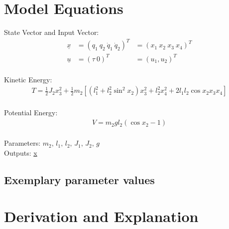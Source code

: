 \documentclass[10pt,a4paper]{article}
\begin{document}
	
	\section{Model Equations} %
	
	State Vector and Input Vector:
	\begin{align*}
		\underline{x} &= (q_1 \ q_2 \ \dot{q}_1 \ \dot{q}_2)^T &= (x_1 \ x_2 \ x_3 \ x_4)^T \\
		\underline{u} &= (\tau \ 0)^T &= (u_1, u_2)^T \\
	\end{align*}
	
	\noindent Kinetic Energy:			
	\begin{subequations}
	\begin{align}
		T = \frac{1}{2}J_2x_3^2 + \frac{1}{2}m_2[(l_1^2 + l_2^2 \sin^2 x_2)x_3^2 + l_2^2x_4^2 + 2l_1l_2 \cos x_2x_3x_4] \\
	\end{align}
	\end{subequations}
	
	\noindent Potential Energy:			
	\begin{subequations}
	\begin{align}
		V = m_2gl_2(\cos x_2 - 1) \\
	\end{align}
	\end{subequations}

	\noindent
	Parameters: $m_2, \, l_1, \, l_2, \, J_1, \, J_2, \, g$ %
	\\
	Outputs: \underline{x}

	
	
	\subsection{Exemplary parameter values}
	

	
	\section{Derivation and Explanation} %
	
\end{document}
